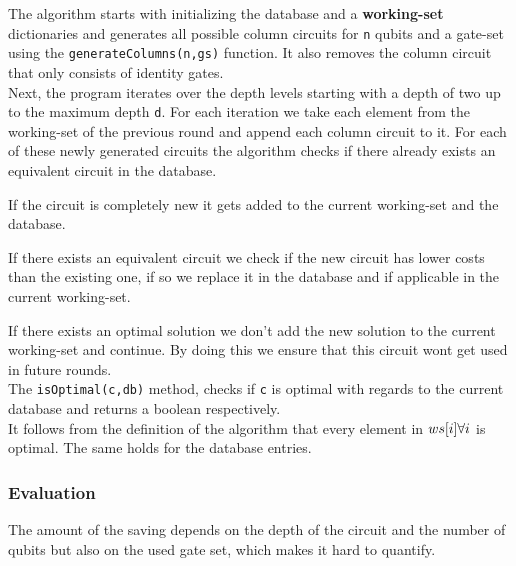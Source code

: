 The algorithm starts with initializing the database and a \textbf{working-set} dictionaries and generates all possible column circuits for \texttt{n} qubits and a gate-set using the \texttt{generateColumns(n,gs)} function. It also removes the column circuit that only consists of identity gates.\\

Next, the program iterates over the depth levels starting with a depth of two up to the maximum depth \texttt{d}. For each iteration we take each element from the working-set of the previous round and append each column circuit to it. For each of these newly generated circuits the algorithm checks if there already exists an equivalent circuit in the database. 

If the circuit is completely new it gets added to the current working-set and the database. 

If there exists an equivalent circuit we check if the new circuit has lower costs than the existing one, if so we replace it in the database and if applicable in the current working-set. 

If there exists an optimal solution we don't add the new solution to the current working-set and continue. By doing this we ensure that this circuit wont get used in future rounds.\\

The \texttt{isOptimal(c,db)} method, checks if \texttt{c} is optimal with regards to the current database  and returns a boolean respectively.\\

It follows from the definition of the algorithm that every element in $ws[i]\space\forall i$ is optimal. The same holds for the database entries.


\subsubsection{Evaluation}
The amount of the saving depends on the depth of the circuit and the number of qubits but also on the used gate set, which makes it hard to quantify. 

